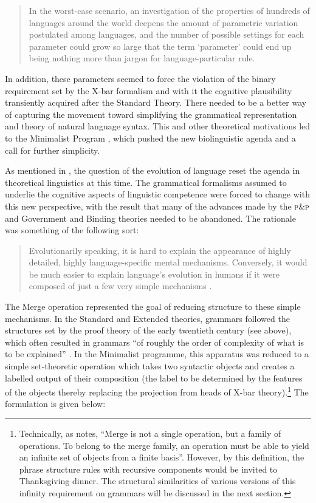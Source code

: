 \documentclass[output=paper]{langscibook}
\begin{document}
\begin{quote}
In the worst-case scenario, an investigation of the properties of hundreds of languages around the world deepens the amount of parametric variation postulated among languages, and the number of possible settings for each parameter could grow so large that the term \textquoteleft{}parameter' could end up being nothing more than jargon for language-particular rule. \citep[64]{Newmeyer1996}
\end{quote}

In addition, these parameters seemed to force the violation of the binary requirement set by the X-bar formalism and with it the cognitive plausibility transiently acquired after the Standard Theory. There needed to be a better way of capturing the movement toward simplifying the grammatical representation and theory of natural language syntax. This and other theoretical motivations led to the Minimalist Program \citep{Chomsky1995MP}, which pushed the new biolinguistic agenda and a call for further simplicity. 

As mentioned in , the question of the evolution of language reset the agenda in theoretical linguistics at this time. The grammatical formalisms assumed to underlie the cognitive aspects of linguistic competence were forced to change with this new perspective, with the result that many of the advances made by the \textsc{p\&p} and Government and Binding \citep{Chomsky1981} theories needed to be abandoned. The rationale was something of the following sort:

\begin{quote}
Evolutionarily speaking, it is hard to explain the appearance of highly detailed, highly language-specific mental mechanisms. Conversely, it would be much easier to explain language's evolution in humans if it were composed of just a few very simple mechanisms \citep[175]{Johnson2015}.
\end{quote}

The Merge operation represented the goal of reducing structure to these simple mechanisms. In the Standard and Extended theories, grammars followed the structures set by the proof theory of the early twentieth century (see above), which often resulted in grammars ``of roughly the order of complexity of what is to be explained'' \citep[233]{Chomsky1995}. In the Minimalist programme, this apparatus was reduced to a simple set-theoretic operation which takes two syntactic objects and creates a labelled output of their composition (the label to be determined by the features of the objects thereby replacing the projection from heads of X-bar theory).\footnote{Technically, as \citet[307]{Langendoen:2003} notes, ``Merge is not a single operation, but a family of operations. To belong to the merge family, an operation must be able to yield an infinite set of objects from a finite basis''. However, by this definition, the phrase structure rules with recursive components would be invited to Thanksgiving dinner. The structural similarities of various versions of this infinity requirement on grammars will be discussed in the next section.} The formulation is given below:
\end{document}
